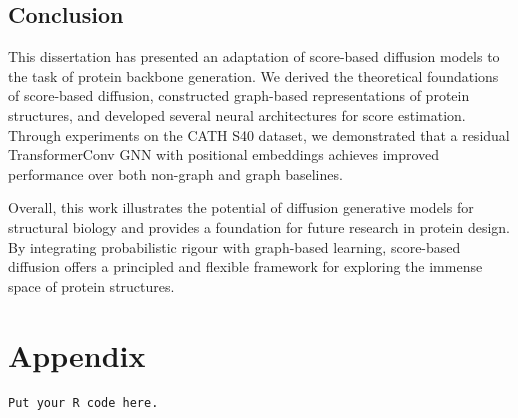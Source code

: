 \documentclass[a4paper,12pt]{article}
\begin{document}
\subsection{Conclusion}\label{subsec:conclusion}
This dissertation has presented an adaptation of score-based diffusion models to the task of protein backbone generation. We derived the theoretical foundations of score-based diffusion, constructed graph-based representations of protein structures, and developed several neural architectures for score estimation. Through experiments on the CATH S40 dataset, we demonstrated that a residual TransformerConv GNN with positional embeddings achieves improved performance over both non-graph and graph baselines. 

Overall, this work illustrates the potential of diffusion generative models for structural biology and provides a foundation for future research in protein design. By integrating probabilistic rigour with graph-based learning, score-based diffusion offers a principled and flexible framework for exploring the immense space of protein structures.

\clearpage

\section*{Appendix}
\begin{verbatim}
Put your R code here.
\end{verbatim}

\clearpage



\end{document}
